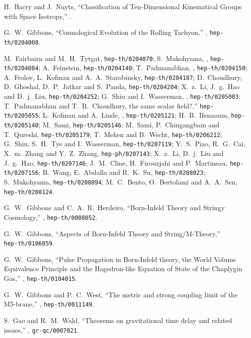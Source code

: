 \documentclass[a4paper,12pt]{article}
\begin{document}
\begin{thebibliography}{99}
 H.\ Bacry and J.\ Nuyts,
 ``Classification of Ten-Dimensional Kinematical Groups with Space
 Isotropy,'' .
 
 G.\ W.\ Gibbons,   ``Cosmological Evolution 
of the Rolling Tachyon,'' , 
{\tt hep-th/0204008}.

M.~Fairbairn and M.~H.~Tytgat, 
{\tt hep-th/0204070};
S.~Mukohyama, 
,
{\tt hep-th/0204084};
A.~Feinstein,
{\tt hep-th/0204140};
T.~Padmanabhan,
,
{\tt hep-th/0204150};
A.~Frolov, L.~Kofman and A.~A.~Starobinsky, 
{\tt hep-th/0204187};
D.~Choudhury, D.~Ghoshal, D.~P.~Jatkar and S.~Panda, 
{\tt hep-th/0204204};
X.~z.~Li, J.~g.~Hao and D.~j.~Liu, 
{\tt hep-th/0204252};
G.~Shiu and I.~Wasserman, 
, 
{\tt hep-th/0205003};
T.~Padmanabhan and T.~R.~Choudhury, 
the  same scalar field?,'' 
{\tt hep-th/0205055};
L.~Kofman and A.~Linde, 
, 
{\tt hep-th/0205121};
H.~B.~Benaoum, 
{\tt hep-th/0205140};
M.~Sami, 
{\tt hep-th/0205146};
M.~Sami, P.~Chingangbam and T.~Qureshi, 
{\tt hep-th/0205179};
T.~Mehen and B.~Wecht, 
{\tt hep-th/0206212};
G.~Shiu, S.~H.~Tye and I.~Wasserman, 
{\tt hep-th/0207119};
Y.~S.~Piao, R.~G.~Cai, X.~m.~Zhang and Y.~Z.~Zhang, 
{\tt hep-ph/0207143};
X.~z.~Li, D.~j.~Liu and J.~g.~Hao,
{\tt hep-th/0207146};
J.~M.~Cline, H.~Firouzjahi and P.~Martineau,
{\tt hep-th/0207156};
B.~Wang, E.~Abdalla and R.~K.~Su,
{\tt hep-th/0208023};
S.~Mukohyama,
{\tt hep-th/0208094};
M.~C.~Bento, O.~Bertolami and A.~A.~Sen,
{\tt hep-th/0208124}.

 G.\ W.\ Gibbons and C.\ A.\ R.\
Herdeiro, ``Born-Infeld Theory and Stringy Cosmology,'' 
,  {\tt hep-th/0008052}.

 G.\ W.\ Gibbons, 
``Aspects of Born-Infeld Theory and String/M-Theory,'' \\
{\tt hep-th/0106059}.

 G.\ W.\ Gibbons, ``Pulse Propagation in Born-Infeld
theory, the World Volume Equivalence Principle and the Hagedron-like
Equation of State of the Chaplygin Gas,'' 
,  {\tt hep-th/0104015}.

 G.\ W.\ Gibbons and P.\ C.\ West, 
``The metric and strong coupling limit of the M5-brane,'' 
,  {\tt hep-th/0011149}.


 S.\ Gao and R.\ M.\ Wald, 
``Theorems on  gravitational time delay and related issues,'' 
,  {\tt gr-qc/0007021}.


\end{thebibliography}
\end{document}
